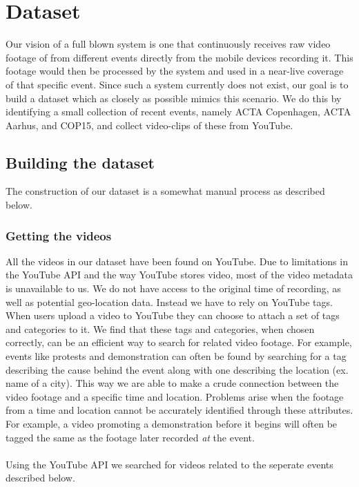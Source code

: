 \section{Dataset}\label{sec:dataset}
%
Our vision of a full blown system is one that continuously receives raw video footage of from different events directly from the mobile devices recording it. This footage would then be processed by the system and used in a near-live coverage of that specific event. Since such a system currently does not exist, our goal is to build a dataset which as closely as possible mimics this scenario. We do this by identifying a small collection of recent events, namely ACTA Copenhagen, ACTA Aarhus, and COP15, and collect video-clips of these from YouTube.
%
\subsection{Building the dataset}
%
The construction of our dataset is a somewhat manual process as described below. %
%
\subsubsection{Getting the videos}
%
All the videos in our dataset have been found on YouTube. Due to limitations in the YouTube API and the way YouTube stores video, most of the video metadata is unavailable to us. We do not have access to the original time of recording, as well as potential geo-location data. Instead we have to rely on YouTube tags. When users upload a video to YouTube they can choose to attach a set of tags and categories to it. We find that these tags and categories, when chosen correctly, can be an efficient way to search for related video footage. For example, events like protests and demonstration can often be found by searching for a tag describing the cause behind the event along with one describing the location (ex. name of a city). This way we are able to make a crude connection between the video footage and a specific time and location. Problems arise when the footage from a time and location cannot be accurately identified through these attributes. For example, a video promoting a demonstration before it begins will often be tagged the same as the footage later recorded \emph{at} the event.\\\\ %
%
Using the YouTube API we searched for videos related to the seperate events described below.
%
